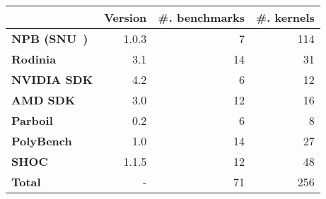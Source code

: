 \begin{tabular}{| l r r r |}
  \hline
  \rowcolor{gray!50}
  & \textbf{Version} & \textbf{\#. benchmarks} & \textbf{\#. kernels}\\
  \hline
  \textbf{NPB (SNU~\cite{Seo2011})} & 1.0.3 & 7 & 114 \\
  \textbf{Rodinia~\cite{Che2009}} & 3.1 & 14 & 31 \\
  \textbf{NVIDIA SDK} & 4.2 & 6 & 12 \\
  \textbf{AMD SDK} & 3.0 & 12 & 16 \\
  \textbf{Parboil~\cite{Stratton2012}} & 0.2 & 6 & 8 \\
  \textbf{PolyBench~\cite{Grauer-Gray2012}} & 1.0 & 14 & 27 \\
  \textbf{SHOC~\cite{Danalis2010}} & 1.1.5 & 12 & 48 \\
  \textbf{Total} & - & 71 & 256 \\
  \hline
\end{tabular}
